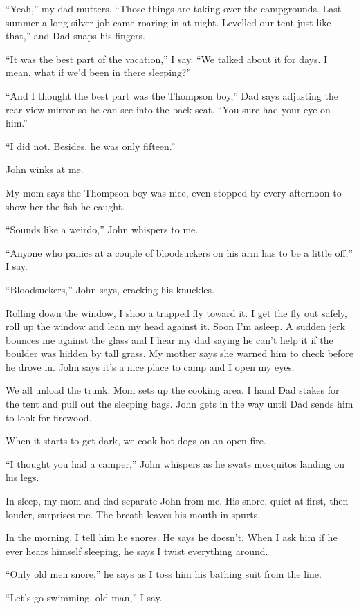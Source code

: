\documentclass[twoside,10pt]{book}
\begin{document}
``Yeah,'' my dad mutters. ``Those things are taking over the
campgrounds. Last summer a long silver job came roaring in at night.
Levelled our tent just like that,'' and Dad snaps his fingers.

``It was the best part of the vacation,'' I say. ``We talked about it
for days. I mean, what if we'd been in there sleeping?''

``And I thought the best part was the Thompson boy,'' Dad says adjusting
the rear-view mirror so he can see into the back seat. ``You sure had
your eye on him.''

``I did not. Besides, he was only fifteen.''

John winks at me.

My mom says the Thompson boy was nice, even stopped by every afternoon
to show her the fish he caught.

``Sounds like a weirdo,'' John whispers to me.

``Anyone who panics at a couple of bloodsuckers on his arm has to be a
little off,'' I say.

``Bloodsuckers,'' John says, cracking his knuckles.

Rolling down the window, I shoo a trapped fly toward it. I get the fly
out safely, roll up the win­dow and lean my head against it. Soon I'm
asleep. A sudden jerk bounces me against the glass and I hear my dad
saying he can't help it if the boulder was hidden by tall grass. My
mother says she warned him to check before he drove in. John says it's a
nice place to camp and I open my eyes.

We all unload the trunk. Mom sets up the cooking area. I hand Dad stakes
for the tent and pull out the sleeping bags. John gets in the way until
Dad sends him to look for firewood.

When it starts to get dark, we cook hot dogs on an open fire.

``I thought you had a camper,'' John whispers as he swats mosquitos
landing on his legs.

In sleep, my mom and dad separate John from me. His snore, quiet at
first, then louder, surprises me. The breath leaves his mouth in spurts.

In the morning, I tell him he snores. He says he doesn't. When I ask him
if he ever hears himself sleeping, he says I twist everything around.

``Only old men snore,'' he says as I toss him his bathing suit from the
line.

``Let's go swimming, old man,'' I say.
\end{document}
